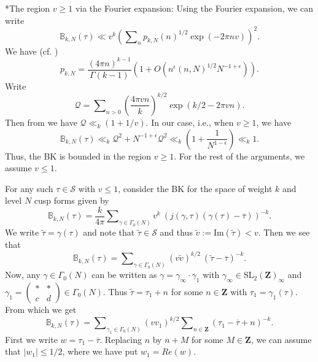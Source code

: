 \documentclass[11pt]{amsart}
\makeatletter
\numberwithin{equation}{section}
\renewcommand\subsubsection{\@secnumfont}{\bfseries}%
\renewcommand\subsubsection{\@startsection{subsubsection}{3}
  \z@{.5\linespacing\@plus.7\linespacing}{-.5em}%
  {\normalfont\bfseries}}
\theoremstyle{plain}
\theoremstyle{definition}
\newcommand{\mbb}{\mathbb}
\newcommand{\mf}{\mathbf}
\newcommand{\mc}{\mathcal}
\newcommand{\mrm}{\mathrm}
\newcommand{\im}{\mrm{Im}}
\newcommand{\sumn}{\sum \nolimits}
\newcommand{\smat}[4]{\left( \begin{smallmatrix}#1&#2\\#3&#4\end{smallmatrix}\right)}
\newcommand{\sltwo}{\mrm{SL}_2(\mf Z)}
\makeatother
\begin{document}
\subsubsection*{The region $v\ge 1$ via the Fourier expansion:}
Using the Fourier expansion, we can write
\begin{equation}
    \mbb B_{k,N}(\tau)\ll v^k \left(\sumn_n p_{k,N}(n)^{1/2} \exp(-2\pi n v)\right)^2.
\end{equation}
We have (cf. \cite{iwaniecaut})
\begin{equation} \label{pkN}
p_{k,N}=\frac{(4\pi n)^{k-1}}{\Gamma(k-1)}\left(1+O(n^\epsilon (n,N)^{1/2} N^{-1+\epsilon})\right). 
\end{equation}
Write
\begin{equation}
    \mc Q=\sumn_{n>0} \left(\frac{4\pi vn}{k}\right)^{k/2}\exp(k/2-2\pi v n).
\end{equation}
Then from \cite[Lemma 7.8]{sd-hk} we have $\mc Q\ll _k (1+1/v)$. In our case, i.e., when $v\ge 1$,  we have
\begin{equation}\label{BKNbound}
    \mbb B_{k,N}(\tau)\ll_k \mc Q^2 + N^{-1+\epsilon} \mc Q^2\ll _k \left(1+\frac{1}{N^{1-\epsilon}}\right)\ll _k 1.
\end{equation}
Thus, the BK is bounded in the region $v\ge 1$. For the rest of the arguments, we assume $v\le 1$.

For any such $\tau\in \mc S$ with $v\le 1$, consider the BK for the space of weight $k$ and level $N$ cusp forms given by
\begin{equation}
   \mbb B_{k,N}(\tau)= \frac{k}{4 \pi} \sumn_{\gamma\in\Gamma_0(N)}v^k\  \left(j(\gamma,\tau)(\gamma(\tau)-\overline{\tau})\right)^{-k}.
\end{equation}
We write $\tilde{\tau}=\gamma(\tau)$ and note that $\tilde\tau\in\mc S$ and thus $\tilde v:=\im(\tilde\tau)<v$. Then we see that
\begin{equation}
   \mbb B_{k,N}(\tau)= \sumn_{\gamma\in\Gamma_0(N)}(v \tilde v)^{k/2}\  (\tilde \tau-\overline{\tau})^{-k}.
\end{equation}
Now, any $\gamma\in\Gamma_0(N)$ can be written as $\gamma=\gamma_\infty\cdot\gamma_1$ with $\gamma_\infty\in \sltwo_\infty$ and $\gamma_1=\smat{*}{*}{c}{d}\in\Gamma_0(N)$. Thus $\tilde \tau =\tau_1+n$ for some $n\in \mf Z$ with $\tau_1=\gamma_1(\tau)$. From which we get
\begin{equation}
   \mbb B_{k,N}(\tau)= \sumn_{\gamma_1\in\Gamma_0(N)}(v  v_1)^{k/2}\sumn_{n\in\mf Z}  ( \tau_1-\overline{\tau}+n)^{-k}.
\end{equation}
First we write $w= \tau_1-\overline{\tau}$. Replacing $n$ by $n+M$ for some $M\in \mf Z$, we can assume that $|w_1|\le 1/2$, where we have put $w_1=Re(w)$.
\end{document}

